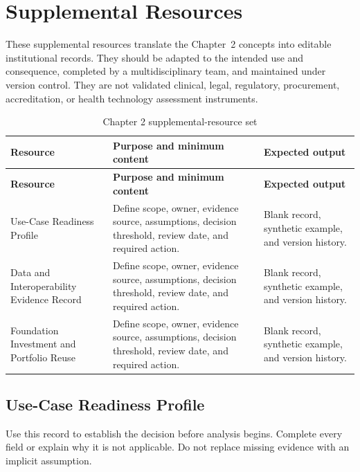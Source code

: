 \section{Supplemental Resources}
\label{sec:comp-ch02-supplemental}

These supplemental resources translate the Chapter~2 concepts into editable
institutional records. They should be adapted to the intended use and consequence,
completed by a multidisciplinary team, and maintained under version control. They
are not validated clinical, legal, regulatory, procurement, accreditation, or health
technology assessment instruments.

\begin{longtable}{@{}p{}p{}p{}@{}}
\caption{Chapter 2 supplemental-resource set}
\label{tab:comp-ch02-supplemental-set}\\
\toprule
\textbf{Resource} & \textbf{Purpose and minimum content} & \textbf{Expected output} \\
\midrule
\endfirsthead
\toprule
\textbf{Resource} & \textbf{Purpose and minimum content} & \textbf{Expected output} \\
\midrule
\endhead
\bottomrule
\endlastfoot
Use-Case Readiness Profile & Define scope, owner, evidence source, assumptions, decision threshold, review date, and required action. & Blank record, synthetic example, and version history. \\
Data and Interoperability Evidence Record & Define scope, owner, evidence source, assumptions, decision threshold, review date, and required action. & Blank record, synthetic example, and version history. \\
Foundation Investment and Portfolio Reuse & Define scope, owner, evidence source, assumptions, decision threshold, review date, and required action. & Blank record, synthetic example, and version history. \\
\end{longtable}

\subsection{Use-Case Readiness Profile}
\label{sec:comp-ch02-supp-1}
Use this record to establish the decision before analysis begins. Complete every
field or explain why it is not applicable. Do not replace missing evidence with an
implicit assumption.

